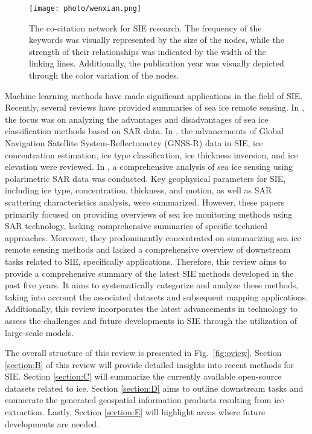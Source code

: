 \begin{figure*}[!tbh]
  \begin{center}
  \texttt{[image: photo/wenxian.png]}\\
  \caption{The co-citation network for SIE research. The frequency of the keywords was visually represented by the size of the nodes, while the strength of their relationships was indicated by the width of the linking lines. Additionally, the publication year was visually depicted through the color variation of the nodes.}\label{fig1}
  \end{center}
\end{figure*}


Machine learning methods have made significant applications in the field of SIE. Recently, several reviews have provided summaries of sea ice remote sensing. In \cite{158zakhvatkina2019satellite}, the focus was on analyzing the advantages and disadvantages of sea ice classification methods based on SAR data. In \cite{159yan2019sea}, the advancements of Global Navigation Satellite System-Reflectometry (GNSS-R) data in SIE, ice concentration estimation, ice type classification, ice thickness inversion, and ice elevation were reviewed. In \cite{157lyu2022meta}, a comprehensive analysis of sea ice sensing using polarimetric SAR data was conducted. Key geophysical parameters for SIE, including ice type, concentration, thickness, and motion, as well as SAR scattering characteristics analysis, were summarized. However, these papers primarily focused on providing overviews of sea ice monitoring methods using SAR technology, lacking comprehensive summaries of specific technical approaches. Moreover, they predominantly concentrated on summarizing sea ice remote sensing methods and lacked a comprehensive overview of downstream tasks related to SIE, specifically applications. Therefore, this review aims to provide a comprehensive summary of the latest SIE methods developed in the past five years. It aims to systematically categorize and analyze these methods, taking into account the associated datasets and subsequent mapping applications. Additionally, this review incorporates the latest advancements in technology to assess the challenges and future developments in SIE through the utilization of large-scale models.

The overall structure of this review is presented in Fig.~\ref{fig:oview}. Section \ref{section:B} of this review will provide detailed insights into recent methods for SIE. Section \ref{section:C} will summarize the currently available open-source datasets related to ice. Section \ref{section:D} aims to outline downstream tasks and enumerate the generated geospatial information products resulting from ice extraction. Lastly, Section \ref{section:E} will highlight areas where future developments are needed.


